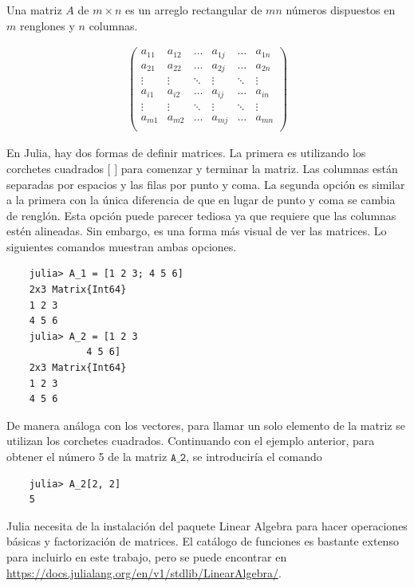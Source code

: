 Una matriz $A$ de $m \times n$ es un arreglo rectangular de $mn$ números dispuestos en $m$ renglones y $n$ columnas. 

\begin{equation*}
    \begin{aligned}
    \begin{pmatrix}
    a_{11} & a_{12} & \dots & a_{1j} & \dots & a_{1n} \\
    a_{21} & a_{22} & \dots & a_{2j} & \dots & a_{2n} \\
    \vdots &  \vdots  &  \ddots &  \vdots  & \ddots &\vdots\\
    a_{i1} & a_{i2} & \dots & a_{ij} & \dots & a_{in} \\
    \vdots &  \vdots  &  \ddots &  \vdots  & \ddots &\vdots\\
     a_{m1} & a_{m2} & \dots & a_{mj} & \dots & a_{mn} \\
    \end{pmatrix} 
    \end{aligned}
\end{equation*}

En \textsf{Julia}, hay dos formas de definir matrices. La primera es utilizando los corchetes cuadrados $[$ $]$ para comenzar y terminar la matriz. Las columnas están separadas por espacios y las filas por punto y coma. La segunda opción es similar a la primera con la única diferencia de que en lugar de punto y coma se cambia de renglón. Esta opción puede parecer tediosa ya que requiere que las columnas estén alineadas. Sin embargo, es una forma más visual de ver las matrices. Lo siguientes comandos muestran ambas opciones. 

\begin{verbatim}
	julia> A_1 = [1 2 3; 4 5 6]
	2x3 Matrix{Int64}
	1 2 3
	4 5 6
	julia> A_2 = [1 2 3
		      4 5 6]
	2x3 Matrix{Int64}
	1 2 3
	4 5 6

\end{verbatim}

De manera análoga con los vectores, para llamar un solo elemento de la matriz se utilizan los corchetes cuadrados. Continuando con el ejemplo anterior, para obtener el número 5 de la matriz $\texttt{A\_2}$, se introduciría el comando 
\begin{verbatim}
	julia> A_2[2, 2]
	5
\end{verbatim}

\textsf{Julia} necesita de la instalación del paquete \textsf{Linear Algebra} para hacer operaciones básicas y factorización de matrices. El catálogo de funciones es bastante extenso para incluirlo en este trabajo, pero se puede encontrar en \url{https://docs.julialang.org/en/v1/stdlib/LinearAlgebra/}.

